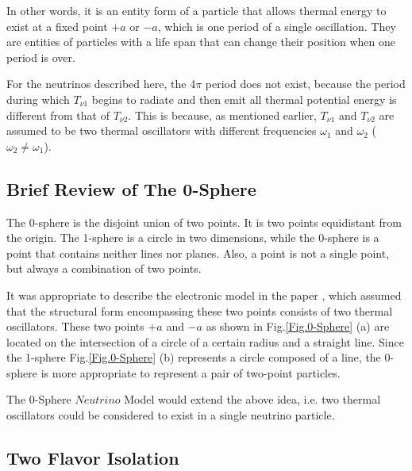 \documentclass[%
 reprint,
 amsmath,amssymb,
 aps,
]{revtex4-1}
\numberwithin{equation}{section}%
\begin{document}
In other words, it is an entity form of a particle that allows thermal energy to exist at a fixed point $+a$ or $-a$, which is one period of a single oscillation. They are entities of particles with a life span that can change their position when one period is over.

For the neutrinos described here, the 4$\pi$ period does not exist, because the period during which $T_{\nu \mathrm{1}}$ begins to radiate and then emit all thermal potential energy is different from that of $T_{\nu \mathrm{2}}$. This is because, as mentioned earlier, $T_{\nu \mathrm{1}}$ and $T_{\nu \mathrm{2}}$ are assumed to be two thermal oscillators with different frequencies $\omega_{\mathrm{1}}$ and $\omega_{\mathrm{2}}$ ($\omega_{\mathrm{2}} \neq \omega_{\mathrm{1}}$).


\subsection{Brief Review of The 0-Sphere}

The 0-sphere is the disjoint union of two points. It is two points equidistant from the origin. The 1-sphere is a circle in two dimensions, while the 0-sphere is a point that contains neither lines nor planes. Also, a point is not a single point, but always a combination of two points.

It was appropriate to describe the electronic model in the paper \cite{Hanamura1}, which assumed that the structural form encompassing these two points consists of two thermal oscillators. These two points $+a$ and $-a$ as shown in Fig.\ref{Fig.0-Sphere} (a) are located on the intersection of a circle of a certain radius and a straight line. Since the 1-sphere Fig.\ref{Fig.0-Sphere} (b) represents a circle composed of a line, the 0-sphere is more appropriate to represent a pair of two-point particles.

The 0-Sphere $Neutrino$ Model would extend the above idea, i.e. two thermal oscillators could be considered to exist in a single neutrino particle.


\subsection{Two Flavor Isolation}
\end{document}
